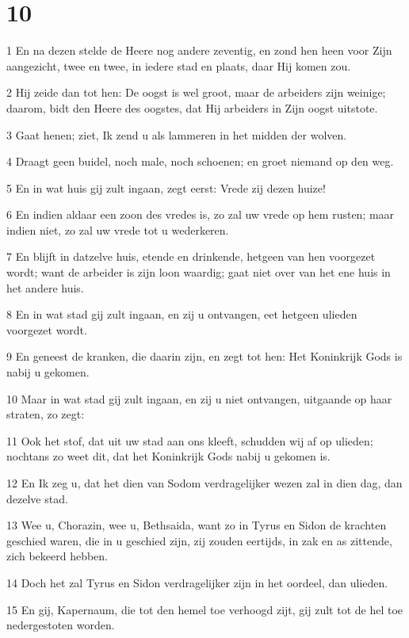 \chapter{10}

\par 1 En na dezen stelde de Heere nog andere zeventig, en zond hen heen voor Zijn aangezicht, twee en twee, in iedere stad en plaats, daar Hij komen zou.
\par 2 Hij zeide dan tot hen: De oogst is wel groot, maar de arbeiders zijn weinige; daarom, bidt den Heere des oogstes, dat Hij arbeiders in Zijn oogst uitstote.
\par 3 Gaat henen; ziet, Ik zend u als lammeren in het midden der wolven.
\par 4 Draagt geen buidel, noch male, noch schoenen; en groet niemand op den weg.
\par 5 En in wat huis gij zult ingaan, zegt eerst: Vrede zij dezen huize!
\par 6 En indien aldaar een zoon des vredes is, zo zal uw vrede op hem rusten; maar indien niet, zo zal uw vrede tot u wederkeren.
\par 7 En blijft in datzelve huis, etende en drinkende, hetgeen van hen voorgezet wordt; want de arbeider is zijn loon waardig; gaat niet over van het ene huis in het andere huis.
\par 8 En in wat stad gij zult ingaan, en zij u ontvangen, eet hetgeen ulieden voorgezet wordt.
\par 9 En geneest de kranken, die daarin zijn, en zegt tot hen: Het Koninkrijk Gods is nabij u gekomen.
\par 10 Maar in wat stad gij zult ingaan, en zij u niet ontvangen, uitgaande op haar straten, zo zegt:
\par 11 Ook het stof, dat uit uw stad aan ons kleeft, schudden wij af op ulieden; nochtans zo weet dit, dat het Koninkrijk Gods nabij u gekomen is.
\par 12 En Ik zeg u, dat het dien van Sodom verdragelijker wezen zal in dien dag, dan dezelve stad.
\par 13 Wee u, Chorazin, wee u, Bethsaida, want zo in Tyrus en Sidon de krachten geschied waren, die in u geschied zijn, zij zouden eertijds, in zak en as zittende, zich bekeerd hebben.
\par 14 Doch het zal Tyrus en Sidon verdragelijker zijn in het oordeel, dan ulieden.
\par 15 En gij, Kapernaum, die tot den hemel toe verhoogd zijt, gij zult tot de hel toe nedergestoten worden.
